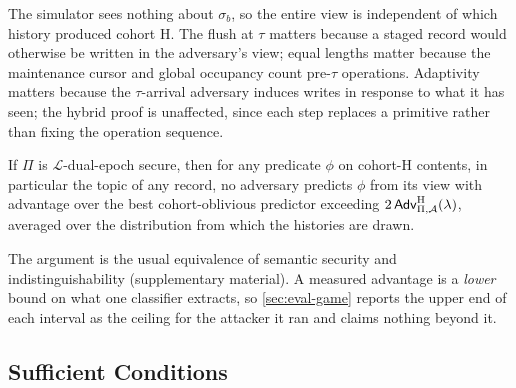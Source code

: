 The simulator sees nothing about $\sigma_b$, so the entire view is independent of which history
produced cohort H. The flush at $\tau$ matters because a staged record would otherwise be written in
the adversary's view; equal lengths matter because the maintenance cursor and global occupancy
count pre-$\tau$ operations. Adaptivity matters because the $\tau$-arrival adversary induces writes
in response to what it has seen; the hybrid proof is unaffected, since each step replaces a
primitive rather than fixing the operation sequence.

\begin{corollary}
\label{cor:predicate}
If $\Pi$ is $\mathcal{L}$-dual-epoch secure, then for any predicate $\phi$ on cohort-H contents,
in particular the topic of any record, no adversary predicts $\phi$ from its view with advantage
over the best cohort-oblivious predictor exceeding $2\,\mathsf{Adv}^{\mathrm{H}}_{\Pi,\mathcal{A}}(\lambda)$, averaged
over the distribution from which the histories are drawn.
\end{corollary}

The argument is the usual equivalence of semantic security and indistinguishability (supplementary
material). A measured advantage is a \emph{lower} bound on what one classifier extracts, so
\cref{sec:eval-game} reports the upper end of each interval as the ceiling for the attacker it ran
and claims nothing beyond it.

\subsection{Sufficient Conditions}
\label{sec:conditions}

